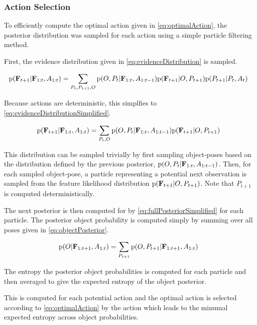             \subsubsection{Action Selection}

                To efficiently compute the optimal action given in \eqref{eq:optimalAction}, the posterior distribution was sampled for each action using a simple particle filtering method. 

                First, the evidence distribution given in \eqref{eq:evidenceDistribution} is sampled.

                \begin{equation}
                    \label{eq:evidenceDistribution}
                    \prob{\set{F}_{t+1}|\set{F}_{1:t}, A_{1:t}} = \sum_{P_t,P_{t+1},O} \prob{O,P_t|\set{F}_{1:t},A_{1:t-1}} \prob{\set{F}_{t+1}|O,P_{t+1}} \prob{P_{t+1}|P_t,A_t}
                \end{equation}

                Because actions are deterministic, this simplfies to \eqref{eq:evidenceDistributionSimplified}.

                \begin{equation}
                    \label{eq:evidenceDistributionSimplified}
                    \prob{\set{F}_{t+1}|\set{F}_{1:t}, A_{1:t}} = \sum_{P_t,O} \prob{O,P_t|\set{F}_{1:t},A_{1:t-1}} \prob{\set{F}_{t+1}|O,P_{t+1}}
                \end{equation}

                This distribution can be sampled trivially by first sampling object-poses based on the distribution defined by the previous posterior, $\text{p}(O,P_t|\mathbf{F}_{1:t},A_{1:t-1})$. Then, for each sampled object-pose, a particle representing a potential next observation is sampled from the feature likelihood distribution $\text{p}(\mathbf{F}_{t+1}|O,P_{t+1})$. Note that $P_{t+1}$ is computed deterministically.

                The next posterior is then computed for by \eqref{eq:fullPosteriorSimplified} for each particle. The posterior object probability is computed simply by summing over all poses given in \eqref{eq:objectPosterior}.

                \begin{equation}
                    \label{eq:objectPosterior}
                    \prob{O|\set{F}_{1:t+1},A_{1:t}} = \sum_{P_{t+1}} \prob{O,P_{t+1}|\set{F}_{1:t+1},A_{1:t}}
                \end{equation}

                The entropy the posterior object probabilities is computed for each particle and then averaged to give the expected entropy of the object posterior. 

                This is computed for each potential action and the optimal action is selected according to \eqref{eq:optimalAction} by the action which leads to the minumal expected entropy across object probabilities.
